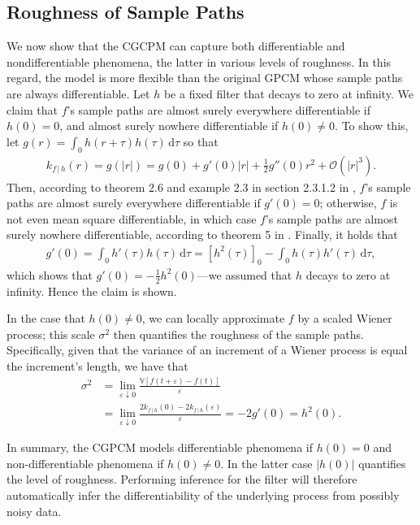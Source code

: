 \documentclass{article}
\newcommand{\e}{\varepsilon}   %
\renewcommand{\O}{\mathcal{O}} %
\newcommand{\id}[1]{\, \mathrm{d} #1}     %
\newcommand{\cond}{\, | \,}               %
\renewcommand{\ll}{\left}
\newcommand{\rr}{\right}
\begin{document}
\subsection{Roughness of Sample Paths}
\label{subsec:roughness}
We now show that the CGCPM can capture both differentiable and nondifferentiable phenomena, the latter in various levels of roughness. In this regard, the model is more flexible than the original GPCM whose sample paths are always differentiable. Let $h$ be a fixed filter that decays to zero at infinity. We claim that $f$'s sample paths are almost surely everywhere differentiable if $h(0)=0$, and almost surely nowhere differentiable if $h(0)\neq 0$. To show this, let $g(r) = \int_0 h(r + \tau) h(\tau) \id{\tau}$ so that
\begin{align*}
    k_{f\cond h}(r) = \! g(|r|) \! = \! g(0) \! + \! g'(0)|r| + \frac{1}{2}g''(0)r^2 + \O(|r|^3).
\end{align*}
Then, according to theorem 2.6 and example 2.3 in section 2.3.1.2 in \cite{Lindgren:2006:Lectures_on_Stationary_Stochastic_Processes}, $f$'s sample paths are almost surely everywhere differentiable if $g'(0)=0$; otherwise, $f$ is not even mean square differentiable, in which case $f$'s sample paths are almost surely nowhere differentiable, according to theorem 5 in \cite{Cambanis:1973:On_Some_Continuity_and_Differentiability}. Finally, it holds that
\begin{align*}
    g'(0)= \int_0 h'(\tau) h(\tau) \id{\tau} = \ll[ h^2(\tau)\rr]_0 - \int_0 h(\tau) h'(\tau) \id{\tau},
\end{align*}
which shows that $g'(0) = -\frac{1}{2} h^2(0)$---we assumed that $h$ decays to zero at infinity. Hence the claim is shown.

In the case that $h(0)\neq 0$, we can locally approximate $f$ by a scaled Wiener process; this scale $\sigma^2$ then quantifies the roughness of the sample paths. Specifically, given that the variance of an increment of a Wiener process is equal the increment's length, we have that
\begin{align*}
    \sigma^2
    &= \lim_{\e \downarrow 0} \frac{\mathbb{V}[f(t+\e)-f(t)]}{\e} \\
    &= \lim_{\e \downarrow 0} \frac{2k_{f\cond h}(0) - 2k_{f\cond h}(\e)}{\e}
    = -2g'(0)
    = h^2(0).
\end{align*}

In summary, the CGPCM models differentiable phenomena if $h(0)=0$ and non-differentiable phenomena if $h(0)\neq 0$. In the latter case $|h(0)|$ quantifies the level of roughness. Performing inference for the filter will therefore automatically infer the differentiability of the underlying process from possibly noisy data.
\end{document}
